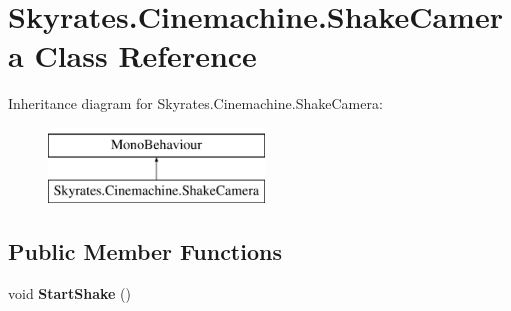 \hypertarget{class_skyrates_1_1_cinemachine_1_1_shake_camera}{\section{Skyrates.\-Cinemachine.\-Shake\-Camera Class Reference}
\label{class_skyrates_1_1_cinemachine_1_1_shake_camera}
}
Inheritance diagram for Skyrates.\-Cinemachine.\-Shake\-Camera\-:\begin{figure}[H]
\begin{center}
\leavevmode
\includegraphics[height=2.000000cm]{class_skyrates_1_1_cinemachine_1_1_shake_camera}
\end{center}
\end{figure}
\subsection*{Public Member Functions}
\begin{DoxyCompactItemize}
\item 
\hypertarget{class_skyrates_1_1_cinemachine_1_1_shake_camera_a52aa6dcd28138635bd1b7d3b504bc3b9}{void {\bfseries Start\-Shake} ()}\label{class_skyrates_1_1_cinemachine_1_1_shake_camera_a52aa6dcd28138635bd1b7d3b504bc3b9}

\end{DoxyCompactItemize}
